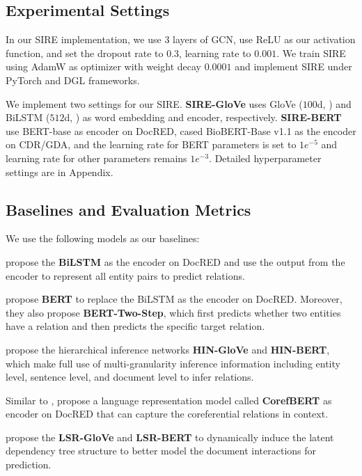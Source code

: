 \documentclass[11pt,a4paper]{article}
\begin{document}
\subsection{Experimental Settings}
In our SIRE implementation, we use $3$ layers of GCN, use ReLU as our activation function, and set the dropout rate to $0.3$, learning rate to $0.001$.
We train SIRE using AdamW \citep{adamW} as optimizer with weight decay $0.0001$ and implement SIRE under PyTorch \citep{PyTorch} and DGL \citep{DGL} frameworks.

We implement two settings for our SIRE. \textbf{SIRE-GloVe} uses GloVe ($100$d, \citealp{GloVe}) and BiLSTM ($512$d, \citealp{BiLSTM}) as word embedding and encoder, respectively.
\textbf{SIRE-BERT} use BERT-base \citep{BERT} as encoder on DocRED, cased BioBERT-Base v1.1 as the encoder on CDR/GDA, and the learning rate for BERT parameters is set to $1e^{-5}$ and learning rate for other parameters remains $1e^{-3}$.
Detailed hyperparameter settings are in Appendix.


\subsection{Baselines and Evaluation Metrics}

We use the following models as our baselines:

\citet{DocRED-paper} propose the \textbf{BiLSTM} \citep{BiLSTM} as the encoder on DocRED and use the output from the encoder to represent all entity pairs to predict relations. 

\citet{finetune-bert} propose \textbf{BERT} to replace the BiLSTM as the encoder on DocRED. Moreover, they also propose \textbf{BERT-Two-Step}, which first predicts whether two entities have a relation and then predicts the specific target relation. 

\citet{HIN} propose the hierarchical inference networks \textbf{HIN-GloVe} and \textbf{HIN-BERT}, which make full use of multi-granularity inference information including entity level, sentence level, and document level to infer relations.

Similar to \citet{finetune-bert}, \citet{CorefBERT} propose a language representation model called \textbf{CorefBERT} as encoder on DocRED that can capture the coreferential relations in context.

\citet{LSR} propose the \textbf{LSR-GloVe} and \textbf{LSR-BERT} to dynamically induce the latent dependency tree structure to better model the document interactions for prediction. 
\end{document}
